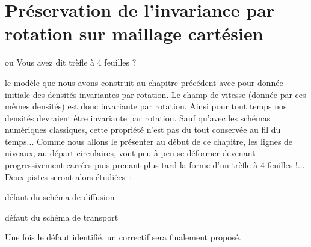 \documentclass[main.tex]{subfiles}
\begin{document}
\chapter{Préservation de l'invariance par rotation sur maillage cartésien}
\vspace{-13mm}
\begin{flushright}
{ \Large\sf ou Vous avez dit trèfle à 4 feuilles ?\ }
\end{flushright}
%

 le modèle que nous avons construit au chapitre précédent avec pour donnée initiale des densités invariantes par rotation. Le champ de vitesse (donnée par ces mêmes densités) est donc invariante par rotation. Ainsi pour tout temps nos densités devraient être invariante par rotation. Sauf qu'avec les schémas numériques classiques, cette propriété n'est pas du tout conservée au fil du temps... Comme nous allons le présenter au début de ce chapitre, les lignes de niveaux, au départ circulaires, vont peu à peu se déformer devenant progressivement carrées puis prenant plus tard la forme d'un trèfle à 4 feuilles !... Deux pistes seront alors étudiées~:
\begin{myitemize}
\item défaut du schéma de diffusion
\item défaut du schéma de transport
\end{myitemize}


\noindent Une fois le défaut identifié, un correctif sera finalement proposé. 
\end{document}
